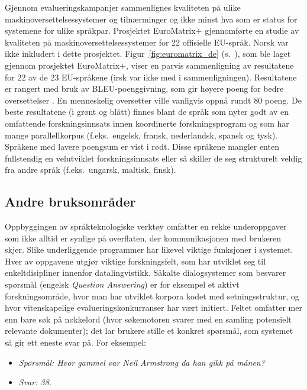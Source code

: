\begin{multicols}{2}
Gjennom evalueringskampanjer sammenlignes kvaliteten på ulike maskinoversettelsessystemer og tilnærminger og ikke minst hva som er status for systemene for ulike språkpar.
Prosjektet EuroMatrix+ gjennomførte en studie av kvaliteten på maskinoversettelsessystemer for 22 offisielle EU-språk. Norsk var ikke inkludert i dette prosjektet.
Figur~\ref{fig:euromatrix_de} (s.~\pageref{fig:euromatrix_de}), som ble laget gjennom prosjektet EuroMatrix+, viser en parvis sammenligning av resultatene for 22 av de 23 EU-språkene (irsk var ikke med i sammenligningen). Resultatene er rangert med bruk av BLEU-poenggivning, som gir høyere poeng for bedre oversettelser \cite{bleu1}. En menneskelig oversetter ville vanligvis oppnå rundt 80 poeng. De beste resultatene (i grønt og blått) finnes blant de språk som nyter godt av en omfattende forskningsinnsats innen koordinerte forskningsprogram og som har mange parallellkorpus (f.eks.~engelsk, fransk, nederlandsk, spansk og tysk). Språkene med lavere poengsum er vist i rødt. Disse språkene mangler enten fullstendig en velutviklet forskningsinnsats eller så skiller de seg strukturelt veldig fra andre språk (f.eks.~ungarsk, maltisk, finsk).  

\subsection{Andre bruksområder}

Oppbyggingen av språkteknologiske verktøy omfatter en rekke underoppgaver som ikke alltid er synlige på overflaten, der kommunikasjonen med brukeren skjer. Slike underliggende programmer har likevel viktige funksjoner i systemet. Hver av oppgavene utgjør viktige forskningsfelt, som har utviklet seg til enkeltdisipliner innenfor datalingvistikk. Såkalte dialogsystemer som besvarer spørsmål (engelsk \textit{Question Answering}) er for eksempel et aktivt forskningsområde, hvor man har utviklet korpora kodet med setningsstruktur, og hvor vitenskapelige evalueringskonkurranser har vært initiert. Feltet omfatter mer enn bare søk på nøkkelord (hvor søkemotoren svarer med en samling potensielt relevante dokumenter); det lar brukere stille et konkret spørsmål, som systemet så gir ett eneste svar på. For eksempel:

\begin{itemize}
\item[] \textit{Spørsmål: Hvor gammel var Neil Armstrong da han gikk på månen?}
\item[] \textit{Svar: 38.}
\end{itemize}


\end{multicols}
